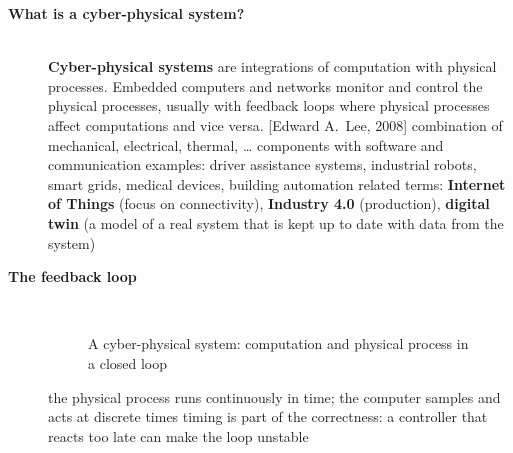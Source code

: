 \begin{description}
\item[{\rot\bf What is a cyber-physical system?}]~\\
{\textbf{Cyber-physical systems} are integrations of computation with physical processes. Embedded computers and networks monitor and control the physical processes, usually with feedback loops where physical processes affect computations and vice versa. [Edward A.\ Lee, 2008]}
\bi
	\ite combination of mechanical, electrical, thermal, \ldots{} components with software and communication
	\ite examples: driver assistance systems, industrial robots, smart grids, medical devices, building automation
	\ite related terms: \textbf{Internet of Things} (focus on connectivity), \textbf{Industry 4.0} (production), \textbf{digital twin} (a model of a real system that is kept up to date with data from the system)
\ei
\os{\newpage}

\item[{\rot\bf The feedback loop}]~\\[-\lblskip]
\begin{figure}[!hbtp]
\begin{center}
\caption{A cyber-physical system: computation and physical process in a closed loop}
\end{center}
\end{figure}
\bi
	\ite the physical process runs continuously in time; the computer samples and acts at discrete times
	\ite timing is part of the correctness: a controller that reacts too late can make the loop unstable
\ei
\os{\newpage}


\end{description}
